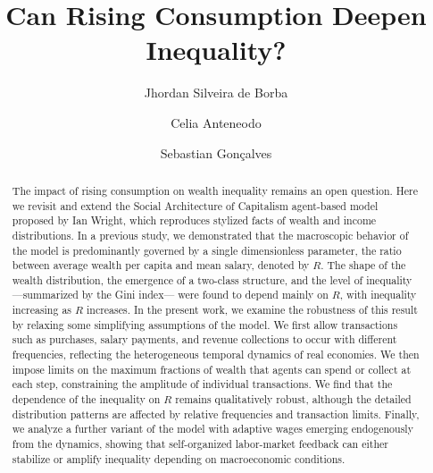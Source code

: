 \documentclass[12pt,preprint]{revtex4-1}
\begin{document}
\title{Can Rising Consumption Deepen Inequality?}

\author{Jhordan Silveira de Borba}

\author{Celia Anteneodo}


\author{Sebastian Gonçalves}

\begin{abstract}
The impact of rising consumption on wealth inequality remains an open question. Here we revisit and extend the Social Architecture of Capitalism agent-based model proposed by Ian Wright, which reproduces stylized facts of wealth and income distributions. In a previous study, we demonstrated that the macroscopic behavior of the model is predominantly governed by a single dimensionless parameter, the ratio between average wealth per capita and mean salary, denoted by $R$. The shape of the wealth distribution, the emergence of a two-class structure, and the level of inequality ---summarized by the Gini index--- were found to depend mainly on $R$, with inequality increasing as $R$ increases.
In the present work, we examine the robustness of this result by relaxing some simplifying assumptions of the model. We first allow transactions such as purchases, salary payments, and revenue collections to occur with different frequencies, reflecting the heterogeneous temporal dynamics of real economies. We then impose limits on the maximum fractions of wealth that agents can spend or collect at each step, constraining the amplitude of individual transactions. We find that the dependence of the inequality on $R$ remains qualitatively robust, although the detailed distribution patterns are affected by relative frequencies and transaction limits.
Finally, we analyze a further variant of the model with adaptive wages emerging endogenously from the dynamics, showing that self-organized labor-market feedback can either stabilize or amplify inequality depending on macroeconomic conditions.

\end{abstract}

\end{document}
